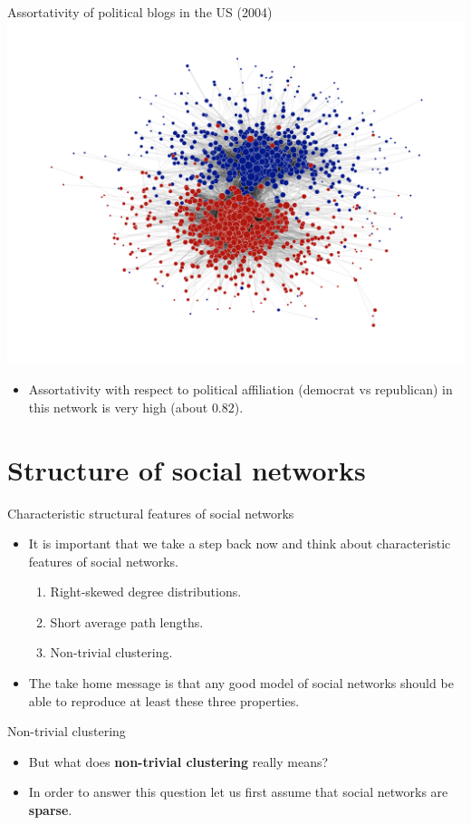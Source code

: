 \documentclass[
    hyperref={colorlinks,linkcolor=blue,urlcolor=blue,citecolor=blue}
]{beamer}
\begin{document}
\begin{frame}{Assortativity of political blogs in the US (2004)}
\centering
\includegraphics[width=.75\textwidth]{overview/polblogs-1}
\pause
\begin{itemize}
    \item Assortativity with respect to political affiliation
    (democrat vs republican) in this network is very high (about $0.82$).

\end{itemize}
\end{frame}

\section{Structure of social networks}

\begin{frame}{Characteristic structural features of social networks}
\begin{itemize}
    \item It is important that we take a step back now and think about
    characteristic features of social networks.
    \begin{enumerate}
        \item<2-> Right-skewed degree distributions.
        \item<3-> Short average path lengths.
        \item<4-> Non-trivial clustering.
    \end{enumerate}
    \item<5-> The take home message is that any good model of social networks
    should be able to reproduce at least these three properties.
\end{itemize}
\end{frame}

\begin{frame}{Non-trivial clustering}
\begin{itemize}
    \item But what does \textbf{non-trivial clustering} really means?
    \item<2-> In order to answer this question let us first assume that
    social networks are \textbf{sparse}.
\end{itemize}
\end{frame}
\end{document}
